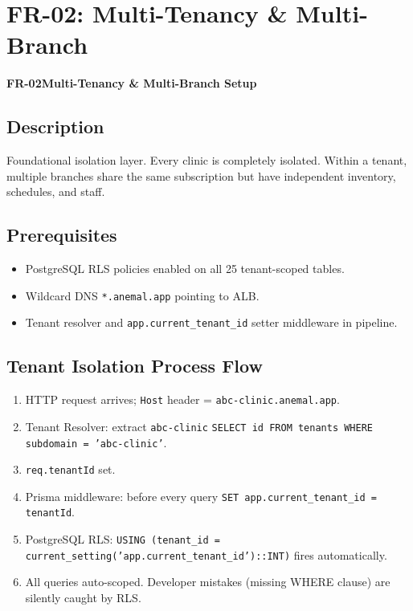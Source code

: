 \documentclass[12pt,a4paper]{report}
\newcommand{\moduleheader}[2]{%
  \par\vspace{6pt}%
  \noindent\colorbox{branddark}{\color{white}\textbf{\small #1}}\quad\textbf{\large #2}%
  \par\vspace{4pt}%
}
\begin{document}
\chapter{FR-02: Multi-Tenancy \& Multi-Branch}

\moduleheader{FR-02}{Multi-Tenancy \& Multi-Branch Setup}

\section{Description}

Foundational isolation layer. Every clinic is completely isolated. Within a tenant, multiple branches share the same subscription but have independent inventory, schedules, and staff.

\section{Prerequisites}

\begin{itemize}
  \item PostgreSQL RLS policies enabled on all 25 tenant-scoped tables.
  \item Wildcard DNS \texttt{*.anemal.app} pointing to ALB.
  \item Tenant resolver and \texttt{app.current\_tenant\_id} setter middleware in pipeline.
\end{itemize}

\section{Tenant Isolation Process Flow}

\begin{enumerate}
  \item HTTP request arrives; \texttt{Host} header = \texttt{abc-clinic.anemal.app}.
  \item Tenant Resolver: extract \texttt{abc-clinic} \textrightarrow{} \texttt{SELECT id FROM tenants WHERE subdomain = 'abc-clinic'}.
  \item \texttt{req.tenantId} set.
  \item Prisma middleware: before every query \textrightarrow{} \texttt{SET app.current\_tenant\_id = tenantId}.
  \item PostgreSQL RLS: \texttt{USING (tenant\_id = current\_setting('app.current\_tenant\_id')::INT)} fires automatically.
  \item All queries auto-scoped. Developer mistakes (missing WHERE clause) are silently caught by RLS.
\end{enumerate}
\end{document}
